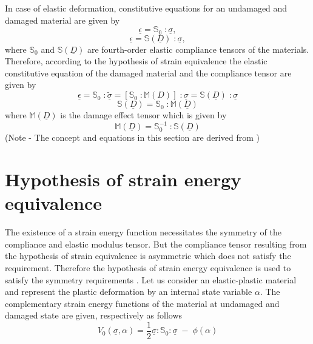 \documentclass[12pt,a4paper,twoside,openright]{report}
\begin{document}
In case of elastic deformation, constitutive equations for an undamaged and damaged material are given by
\begin{equation}
\underline{\epsilon} = \mathbb{S}_{0}\; : \underline{\sigma},
\end{equation}
\begin{equation}
\underline{\epsilon} = \mathbb{S}(\underline{D})\; : \underline{\sigma},
\end{equation}
where $\mathbb{S}_{0}$ and $\mathbb{S}(\underline{D})$  are fourth-order elastic compliance tensors of the materials. Therefore, according to the hypothesis of strain equivalence the elastic constitutive equation of the damaged material and the compliance tensor are given by 
\begin{equation}
\underline{\epsilon} = \mathbb{S}_{0}\; : \underline{\tilde{\sigma}}  =  [\mathbb{S}_{0}\;: \mathbb{M} (D)]\;: \underline{\sigma} = \mathbb{S}(\underline{D})\; : \underline{\sigma}
\end{equation}
\begin{equation}
\mathbb{S}(\underline{D}) = \mathbb{S}_{0}\; : \mathbb{M} (\underline{D})
 \label{eqn:S_HSeq}
\end{equation}
where $\mathbb{M} (\underline{D})$ is the damage effect tensor which is given by 
\begin{equation}
\mathbb{M} (\underline{D})  = \mathbb{S}_{0}^{-1} \; : \mathbb{S}(\underline{D}) 
\end{equation}
(Note - The concept and equations in this section are derived from \citep{murakami2012continuum})

\section{Hypothesis of strain energy equivalence}\label{Hypothesis of strain energy equivalence}
\indent\indent\indent The existence of a strain energy function necessitates the symmetry of the compliance and elastic modulus tensor. But the compliance tensor resulting from the hypothesis of strain equivalence is asymmetric which does not satisfy the requirement. Therefore the hypothesis of strain energy equivalence is used to satisfy the symmetry requirements \citep{cordebois1982damage}. Let us consider an elastic-plastic material and represent the plastic deformation by an internal state variable $\alpha$. The complementary strain energy functions of the material at undamaged and damaged state are given, respectively as follows
\\
\begin{equation}
V_{0}(\underline{\sigma},\alpha) = \frac{1}{2}\underline{\sigma} : \mathbb{S}_{0} : \underline{\sigma} \; - \; \phi(\alpha)
\end{equation}
\end{document}
